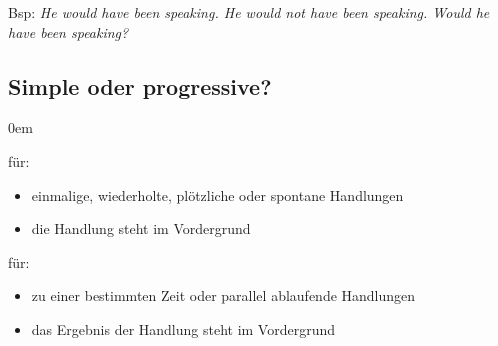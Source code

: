 Bsp: \textit{He would have been speaking. He would not have been speaking. Would he have been speaking?}

\subsection{Simple oder progressive?}
\begin{description}\itemsep0em
	\item [simple] für:
		\begin{itemize}\itemsep0em
			\item einmalige, wiederholte, plötzliche oder spontane Handlungen
			\item die Handlung steht im Vordergrund
		\end{itemize}
	\item [progressive] für:
		\begin{itemize}
			\item zu einer bestimmten Zeit oder parallel ablaufende Handlungen
			\item das Ergebnis der Handlung steht im Vordergrund
		\end{itemize}
\end{description}
